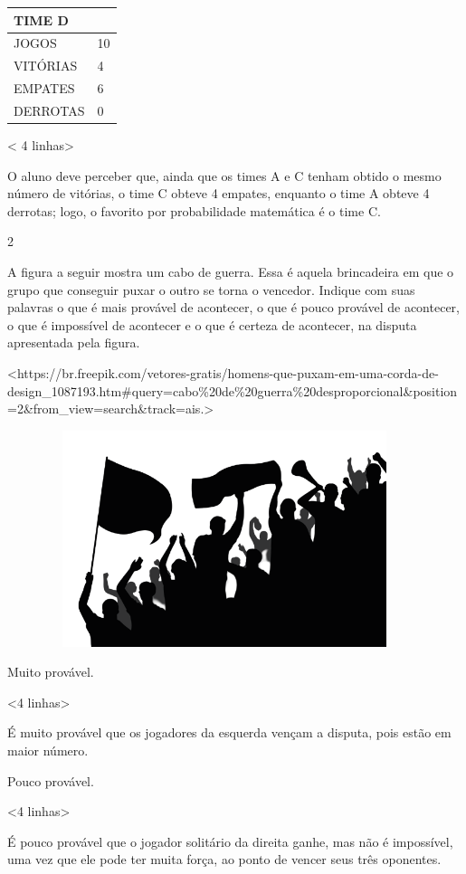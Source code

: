 {{{{{{{{{{{{{\begin{longtable}[]{@{}ll@{}}
\toprule
TIME D\tabularnewline
\midrule
\endhead
JOGOS & 10\tabularnewline
VITÓRIAS & 4\tabularnewline
EMPATES & 6\tabularnewline
DERROTAS & 0\tabularnewline
\bottomrule
\end{longtable}

\textless{} 4 linhas\textgreater{}

O aluno deve perceber que, ainda que os times A e C tenham
obtido o mesmo número de vitórias, o time C obteve 4 empates, enquanto o
time A obteve 4 derrotas; logo, o favorito por probabilidade matemática é o time C.

\num{2}

A figura a seguir mostra um cabo de guerra. Essa é aquela brincadeira em
que o grupo que conseguir puxar o outro se torna o vencedor. Indique com
suas palavras o que é mais provável de acontecer, o que é pouco provável
de acontecer, o que é impossível de acontecer e o que é certeza de
acontecer, na disputa apresentada pela figura.

\textless{}https://br.freepik.com/vetores-gratis/homens-que-puxam-em-uma-corda-de-design\_1087193.htm\#query=cabo\%20de\%20guerra\%20desproporcional\&position=2\&from\_view=search\&track=ais.\textgreater{}

\includegraphics[width=5.00000in,height=2.48958in]{media/image84.png}

Muito provável.

\textless{}4 linhas\textgreater{}

É muito provável que os jogadores da esquerda vençam a disputa, pois
estão em maior número.

Pouco provável.

\textless{}4 linhas\textgreater{}

É pouco provável que o jogador solitário da direita ganhe, mas não é
impossível, uma vez que ele pode ter muita força, ao ponto de vencer seus três oponentes.

}}}}}}}}}}}}}
